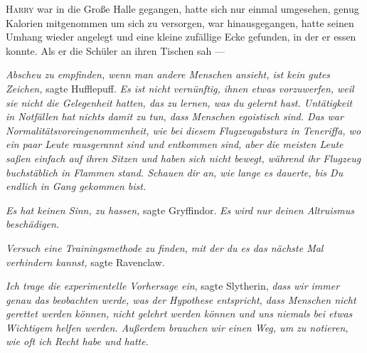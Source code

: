 

\lettrine{H}{arry} war in die Große Halle gegangen, hatte sich nur einmal umgesehen, genug Kalorien mitgenommen um sich zu versorgen, war hinausgegangen, hatte seinen Umhang wieder angelegt und eine kleine zufällige Ecke gefunden, in der er essen konnte. Als er die Schüler an ihren Tischen sah —

\emph{Abscheu zu empfinden, wenn man andere Menschen ansieht, ist kein gutes Zeichen,} sagte Hufflepuff. \emph{Es ist nicht vernünftig, ihnen etwas vorzuwerfen, weil sie nicht die Gelegenheit hatten, das zu lernen, was du gelernt hast. Untätigkeit in Notfällen hat nichts damit zu tun, dass Menschen egoistisch sind. Das war Normalitätsvoreingenommenheit, wie bei diesem Flugzeugabsturz in Teneriffa, wo ein paar Leute rausgerannt sind und entkommen sind, aber die meisten Leute saßen einfach auf ihren Sitzen und haben sich nicht bewegt, während ihr Flugzeug buchstäblich in Flammen stand. Schauen dir an, wie lange es dauerte, bis \emph{Du} endlich in Gang gekommen bist.}

\emph{Es hat keinen Sinn, zu hassen,} sagte Gryffindor. \emph{Es wird nur deinen Altruismus beschädigen.}

\emph{Versuch eine Trainingsmethode zu finden, mit der du es das nächste Mal verhindern kannst,} sagte Ravenclaw.

\emph{Ich trage die experimentelle Vorhersage ein}, sagte Slytherin, \emph{dass wir immer genau das beobachten werde, was der Hypothese entspricht, dass Menschen nicht gerettet werden können, nicht gelehrt werden können und uns niemals bei etwas Wichtigem helfen werden. Außerdem brauchen wir einen Weg, um zu notieren, wie oft ich Recht habe und hatte.}

